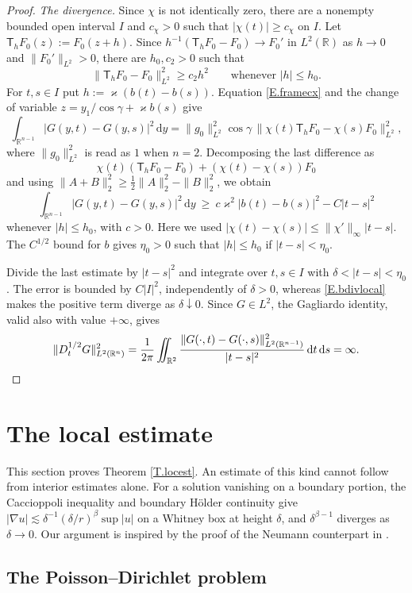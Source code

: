 \documentclass[10pt,a4paper]{amsart}
\numberwithin{equation}{section}
\newcommand{\R}{\mathbb R}
\newcommand{\abs}[1]{\left\vert#1\right\vert}
\newcommand{\dhalf}{D_t^{1/2}}
\renewcommand{\d}{\,\mathrm d}
\begin{document}
\begin{proof}
\emph{The divergence.} Since $\chi$ is not identically zero, there are a
nonempty bounded open interval $I$ and $c_\chi>0$ such that
$|\chi(t)|\ge c_\chi$ on $I$. Let $\mathsf T_hF_0(z):=F_0(z+h)$.
Since $h^{-1}(\mathsf T_hF_0-F_0)\to F_0'$ in $L^2(\R)$ as $h\to0$ and
$\|F_0'\|_{L^2}>0$, there are $h_0,c_2>0$ such that
\[
 \|\mathsf T_hF_0-F_0\|_{L^2}^2\ge c_2h^2
 \qquad\text{whenever }|h|\le h_0.
\]
For $t,s\in I$ put $h:=\varkappa(b(t)-b(s))$. Equation \eqref{E.framecx}
and the change of variable $z=y_1/\cos\gamma+\varkappa b(s)$ give
\[
 \int_{\R^{n-1}}|G(y,t)-G(y,s)|^2\d y
 =\|g_0\|_{L^2}^2\cos\gamma\,
   \|\chi(t)\mathsf T_hF_0-\chi(s)F_0\|_{L^2}^2,
\]
where $\|g_0\|_{L^2}^2$ is read as $1$ when $n=2$. Decomposing the last
difference as
\[
 \chi(t)(\mathsf T_hF_0-F_0)+(\chi(t)-\chi(s))F_0
\]
and using $\|A+B\|_2^2\ge\tfrac12\|A\|_2^2-\|B\|_2^2$, we obtain
\[
 \int_{\R^{n-1}}|G(y,t)-G(y,s)|^2\d y
 \ \ge\ c\varkappa^2|b(t)-b(s)|^2-C|t-s|^2
\]
whenever $|h|\le h_0$, with $c>0$. Here we used
$|\chi(t)-\chi(s)|\le\|\chi'\|_\infty|t-s|$.
The $C^{1/2}$ bound for $b$ gives $\eta_0>0$ such that $|h|\le h_0$
if $|t-s|<\eta_0$.

Divide the last estimate by $|t-s|^2$ and integrate over
$t,s\in I$ with $\delta<|t-s|<\eta_0$. The error is bounded by
$C|I|^2$, independently of $\delta>0$, whereas \eqref{E.bdivlocal} makes
the positive term diverge as $\delta\downarrow0$. Since $G\in L^2$, the
Gagliardo identity, valid also with value $+\infty$, gives
\[
 \|\dhalf G\|_{L^2(\R^n)}^2
 =\frac1{2\pi}\iint_{\R^2}
   \frac{\|G(\cdot,t)-G(\cdot,s)\|_{L^2(\R^{n-1})}^2}{|t-s|^2}
   \d t\d s=\infty.\qedhere
\]
\end{proof}



\section{The local estimate}\label{S.loc}

This section proves Theorem \ref{T.locest}. An estimate of this kind cannot
follow from interior estimates alone. For a solution vanishing on a boundary
portion, the Caccioppoli inequality and boundary H\"older continuity give
$\abs{\nabla u}\lesssim\delta^{-1}(\delta/r)^\beta\sup\abs u$ on a Whitney box
at height $\delta$, and $\delta^{\beta-1}$ diverges as $\delta\to0$. Our
argument is inspired by the proof of the Neumann counterpart in
\cite[\S\S3--4]{DLP2}.

\subsection{The Poisson--Dirichlet problem}\label{ss.PD}
\end{document}
